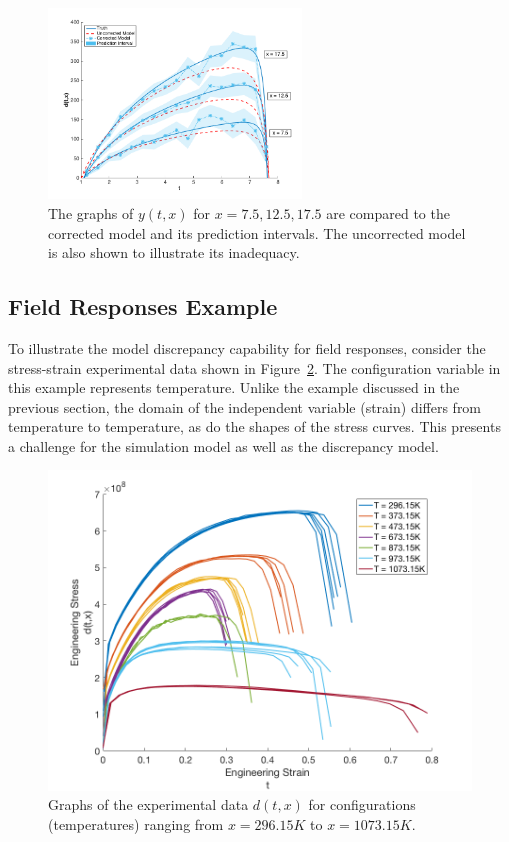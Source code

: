 \begin{figure}
\begin{center}
\includegraphics[width=0.6\textwidth]{images/moddiscrep_correctedlowmidhigh.png}
\end{center}
\label{fig:md_pred}
\vspace{-0.5cm}
\caption{The graphs of $y(t,x)$ for $x = 7.5, 12.5, 17.5$ are compared to the corrected model and its prediction intervals. The uncorrected model is also shown to illustrate its inadequacy.}
\end{figure}

\subsection{Field Responses Example}

To illustrate the model discrepancy capability for field responses, consider
the stress-strain experimental data shown in Figure~\ref{fig:mat_exp}. The 
configuration variable in this example represents temperature. Unlike the
example discussed in the previous section, the domain of the independent 
variable (strain) differs from temperature to temperature, as do the shapes
of the stress curves. This presents a challenge for the simulation model as 
well as the discrepancy model.
 
\begin{figure}[t]
\begin{center}
\includegraphics[width=.6\textwidth]{images/moddiscrep_ExpAllData.png}
\end{center}
\vspace{-0.5cm}
\caption{Graphs of the experimental data $d(t,x)$ for configurations 
(temperatures) ranging from $x = 296.15K$ to $x = 1073.15K$.}
\label{fig:mat_exp}
\end{figure}

